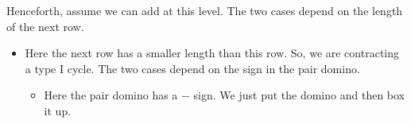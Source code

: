 \documentclass[12pt]{article}
\numberwithin{equation}{section}
\newcommand{\horizontalDominoMaybe}[3]{\filldraw [dominoMaybeStyle] (#2 - 1 + \eps, #1 - 1 + \eps) rectangle + (2 - \teps, 1 -\teps) node [dominoText] {$#3$};}
\newcommand{\verticalDominoMaybeShift}[4]{\filldraw [dominoMaybeStyle] (#2 - 1 + #4 + \eps,  #1 - 1 + \eps) rectangle + (1 - \teps,2 -\teps) node [dominoText] {$#3$};}
\begin{document}
\begin{itemize}
    Henceforth, assume we can add at this level.
    The two cases depend on the length of the next row.
    \begin{itemize}
      \item Here the next row has a smaller length than this row.
      So, we are contracting a type I cycle.
      The two cases depend on the sign in the pair domino.
      \begin{itemize}
        \item Here the pair domino has a $-$ sign.
        We just put the domino and then box it up.
        \begin{figure}[H]
          \centering
        \end{figure}

        \begin{figure}[H]
          \centering
        \end{figure}


\end{itemize}
\end{itemize}
\end{itemize}
\end{document}
